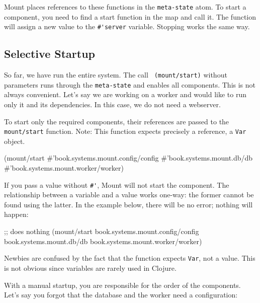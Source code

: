 Mount places references to these functions in the \verb|meta-state| atom. To start a component, you need to find a start function in the map and call it. The function will assign a new value to the \verb|#'server| variable. Stopping works the same way.

\subsection{Selective Startup}

\label{mount-selective}

So far, we have run the entire system. The call \verb| (mount/start)| without parameters runs through the \verb|meta-state| and enables all components. This is not always convenient. Let's say we are working on a worker and would like to run only it and its dependencies. In this case, we do not need a webserver.

To start only the required components, their references are passed to the \verb|mount/start| function. Note: This function expects precisely a reference, a \verb|Var| object.

\begin{english}
  \begin{clojure}
(mount/start
  #'book.systems.mount.config/config
  #'book.systems.mount.db/db
  #'book.systems.mount.worker/worker)
  \end{clojure}
\end{english}

If you pass a value without \verb|#'|, Mount will not start the component. The relationship between a variable and a value works one-way: the former cannot be found using the latter. In the example below, there will be no error; nothing will happen:

\begin{english}
  \begin{clojure}
;; does nothing
(mount/start
  book.systems.mount.config/config
  book.systems.mount.db/db
  book.systems.mount.worker/worker)
  \end{clojure}
\end{english}


Newbies are confused by the fact that the function expects \verb|Var|, not a value. This is not obvious since variables are rarely used in Clojure.

With a manual startup, you are responsible for the order of the components. Let's say you forgot that the database and the worker need a configuration:

